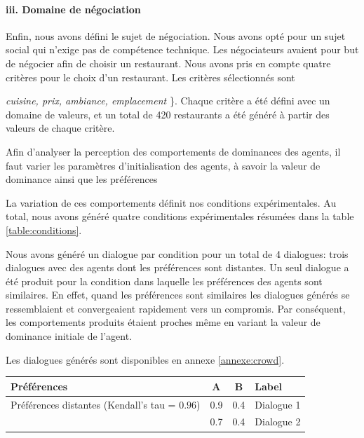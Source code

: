 				\paragraph{iii. Domaine de négociation}
				
				Enfin, nous avons défini le sujet de négociation. Nous avons opté pour un sujet social qui n'exige pas de compétence technique. Les négociateurs avaient pour but de négocier afin de choisir un restaurant. Nous avons pris en compte quatre critères pour le choix d'un restaurant. 	Les critères sélectionnés sont \ {\textit {cuisine, prix, ambiance, emplacement} \}. Chaque critère a été défini avec un domaine de valeurs, et un total de 420 restaurants a été généré à partir des valeurs de chaque critère.
				
				Afin d'analyser la perception des comportements de dominances des agents, il faut varier les paramètres d'initialisation des agents, à savoir la valeur de dominance ainsi que les préférences
				
				La variation de ces comportements définit nos conditions expérimentales. 
				Au total, nous avons généré quatre conditions expérimentales résumées dans la table \ref{table:conditions}. 
				
				Nous avons généré un dialogue par condition pour un total de 4 dialogues: trois dialogues avec des agents dont les préférences sont distantes. Un seul dialogue a été produit pour la condition dans laquelle les préférences des agents sont similaires. En effet, quand les préférences sont similaires les dialogues générés se ressemblaient et convergeaient rapidement vers un compromis. Par conséquent, les comportements produits étaient proches même en variant la valeur de dominance initiale de l'agent.   
				
				Les dialogues générés sont disponibles en annexe \ref{annexe:crowd}.
				
				\begin{table}[h]
					\centering
					\begin{tabular}{ |l|c|c|l| }
						\hline
						\textbf{Préférences}& \textbf{A} & \textbf{B} & \textbf{Label} \\ 
						\hline
						\newline\multirow{3}{*} {Préférences distantes (Kendall's tau = $0.96$)} & 0.9 & 0.4 & Dialogue 1 \\ \cline{2-4}
						
						\newline  & 0.7 & 0.4 & Dialogue 2\\ \cline{2-4}
						

\end{tabular}
\end{table}}
